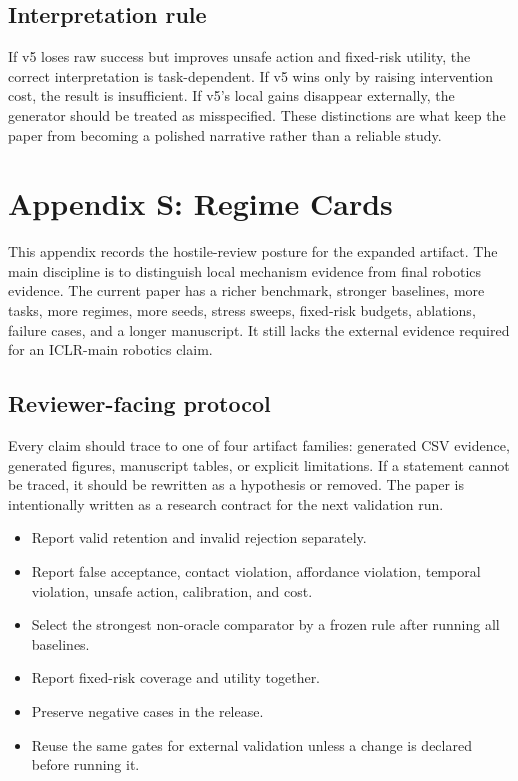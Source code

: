 \documentclass{article}
\begin{document}
\subsection{Interpretation rule}
If v5 loses raw success but improves unsafe action and fixed-risk utility, the correct interpretation is task-dependent. If v5 wins only by raising intervention cost, the result is insufficient. If v5's local gains disappear externally, the generator should be treated as misspecified. These distinctions are what keep the paper from becoming a polished narrative rather than a reliable study.


\section{Appendix S: Regime Cards}
This appendix records the hostile-review posture for the expanded artifact. The main discipline is to distinguish local mechanism evidence from final robotics evidence. The current paper has a richer benchmark, stronger baselines, more tasks, more regimes, more seeds, stress sweeps, fixed-risk budgets, ablations, failure cases, and a longer manuscript. It still lacks the external evidence required for an ICLR-main robotics claim.

\subsection{Reviewer-facing protocol}
Every claim should trace to one of four artifact families: generated CSV evidence, generated figures, manuscript tables, or explicit limitations. If a statement cannot be traced, it should be rewritten as a hypothesis or removed. The paper is intentionally written as a research contract for the next validation run.

\begin{itemize}
\item Report valid retention and invalid rejection separately.
\item Report false acceptance, contact violation, affordance violation, temporal violation, unsafe action, calibration, and cost.
\item Select the strongest non-oracle comparator by a frozen rule after running all baselines.
\item Report fixed-risk coverage and utility together.
\item Preserve negative cases in the release.
\item Reuse the same gates for external validation unless a change is declared before running it.
\end{itemize}
\end{document}
